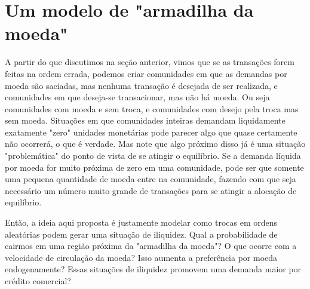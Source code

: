 \documentclass{article}
\begin{document}
\section{Um modelo de "armadilha da moeda"}
\par A partir do que discutimos na seção anterior, vimos que se as transações forem feitas na ordem errada, podemos criar comunidades em que as demandas por moeda são saciadas, mas nenhuma transação é desejada de ser realizada, e comunidades em que deseja-se transacionar, mas não há moeda. Ou seja comunidades com moeda e sem troca, e comunidades com desejo pela troca mas sem moeda. Situações em que comunidades inteiras demandam liquidamente exatamente "zero" unidades monetárias pode parecer algo que quase certamente não ocorrerá, o que é verdade. Mas note que algo próximo disso já é uma situação "problemática" do ponto de vista de se atingir o equilíbrio. Se a demanda líquida por moeda for muito próxima de zero em uma comunidade, pode ser que somente uma pequena quantidade de moeda entre na comunidade, fazendo com que seja necessário um número muito grande de transações para se atingir a alocação de equilíbrio.
\par Então, a ideia aqui proposta é justamente modelar como trocas em ordens aleatórias podem gerar uma situação de iliquidez. Qual a probabilidade de cairmos em uma região próxima da "armadilha da moeda"? O que ocorre com a velocidade de circulação da moeda?  Isso aumenta a preferência por moeda endogenamente? Essas situações de iliquidez promovem uma demanda maior por crédito comercial?
\end{document}
